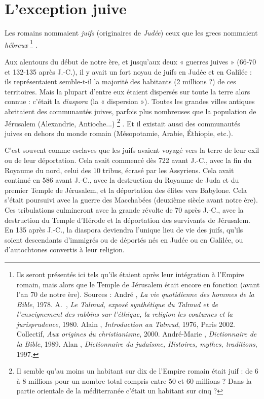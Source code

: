 
\chapter{L'exception juive}

 Les romains nommaient \emph{juifs} (originaires de \emph{Judée}) ceux que les grecs nommaient \emph{hébreux}%
\footnote{Ils seront présentés ici tels qu'ils étaient après leur intégration à l'Empire romain, mais alors que le Temple de Jérusalem était encore en fonction (avant l'an 70 de notre ère).
Sources : André , \emph{La vie quotidienne des hommes de la Bible}, 1978. A.~, \emph{Le Talmud, exposé synthétique du Talmud et de l'enseignement des rabbins sur l'éthique, la religion les coutumes et la jurisprudence}, 1980. Alain , \emph{Introduction au Talmud}, 1976, Paris 2002. Collectif, \emph{Aux origines du christianisme}, 2000. André-Marie , \emph{Dictionnaire de la Bible}, 1989. Alan , \emph{Dictionnaire du judaïsme, Histoires, mythes, traditions}, 1997.}%
.

 Aux alentours du début de notre ère, et jusqu'aux deux « guerres juives » (\hbox{66-70} et \hbox{132-135} après J.-C.), il y avait un fort noyau de juifs en Judée et en Galilée : ils représentaient semble-t-il la majorité des habitants (2 millions ?) de ces territoires. Mais la plupart d'entre eux étaient dispersés sur toute la terre alors connue : c'était la \emph{diaspora} (la « dispersion »). Toutes les grandes villes antiques abritaient des communautés juives, parfois plus nombreuses que la population de Jérusalem (Alexandrie, Antioche...)%
\footnote{Il semble qu'au moins un habitant sur dix de l'Empire romain était juif : de 6 à 8 millions pour un nombre total compris entre 50 et 60 millions ? Dans la partie orientale de la méditerranée c'était un habitant sur cinq ?}%
. Et il existait aussi des communautés juives en dehors du monde romain (Mésopotamie, Arabie, Éthiopie, etc.).

 C'est souvent comme esclaves que les juifs avaient voyagé vers la terre de leur exil ou de leur déportation. Cela avait commencé dès 722 avant J.-C., avec la fin du Royaume du nord, celui des 10 tribus, écrasé par les Assyriens. Cela avait continué en 586 avant J.-C., avec la destruction du Royaume de Juda et du premier Temple de Jérusalem, et la déportation des élites vers Babylone. Cela s'était poursuivi avec la guerre des Macchabées (deuxième siècle avant notre ère). Ces tribulations culmineront avec la grande révolte de 70 après J.-C., avec la destruction du Temple d'Hérode et la déportation des survivants de Jérusalem. En 135 après J.-C., la diaspora deviendra l'unique lieu de vie des juifs, qu'ils soient descendants d'immigrés ou de déportés nés en Judée ou en Galilée, ou d'autochtones convertis à leur religion. 

